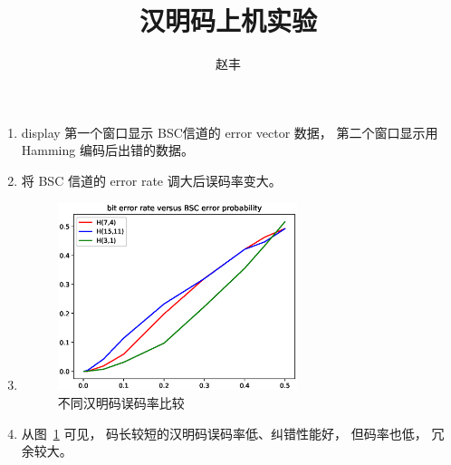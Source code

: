 \documentclass{ctexart}
\begin{document}
    \title{汉明码上机实验}
    \author{赵丰}
    \maketitle
    \begin{enumerate}[label = (\alph*)]
    \item display 第一个窗口显示 BSC信道的 error vector 数据， 第二个窗口显示用 Hamming 编码后出错的数据。
    \item 将 BSC 信道的 error rate 调大后误码率变大。
    \item 
    
    \begin{figure}[!ht]
        \centering
        \includegraphics[width=7cm]{hamming.eps}
        \caption{不同汉明码误码率比较}\label{fig}
    \end{figure}

    \item 从图~\ref{fig} 可见， 码长较短的汉明码误码率低、纠错性能好， 但码率也低， 冗余较大。
    \end{enumerate}
\end{document}
